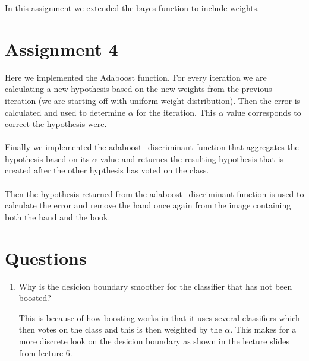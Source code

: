 \documentclass[a4paper]{article}
\begin{document}
In this assignment we extended the bayes function to include weights.

\section{Assignment 4}
Here we implemented the Adaboost function. For every iteration we are
calculating a new hypothesis based on the new weights from the previous iteration
(we are starting off with uniform weight distribution). Then the error is calculated
and used to determine $\alpha$ for the iteration. This $\alpha$ value corresponds
to correct the hypothesis were.
\\
\\
\noindent Finally we implemented the adaboost\_discriminant function that
aggregates the hypothesis based on its $\alpha$ value and returnes the resulting
hypothesis that is created after the other hypthesis has voted on the class.
\\
\\
\noindent Then the hypothesis returned from the adaboost\_discriminant function
is used to calculate the error and remove the hand once again from the image
containing both the hand and the book.

\section{Questions}

\begin{enumerate}
\item Why is the desicion boundary smoother for the classifier that has not been
boosted?

This is because of how boosting works in that it uses several classifiers which
then votes on the class and this is then weighted by the $\alpha$. This makes
for a more discrete look on the desicion boundary as shown in the lecture slides
from lecture 6.
\end{enumerate}
\end{document}
